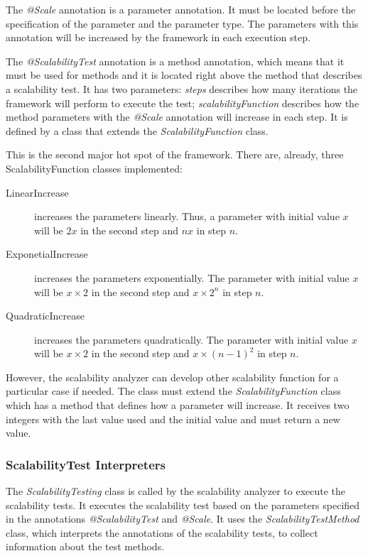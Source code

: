 The \emph{@Scale} annotation is a parameter annotation. It must be located before the specification of the parameter and the parameter type. The parameters with this annotation will be increased by the framework in each execution step.

The \emph{@ScalabilityTest} annotation is a method annotation, which means that it must be used for methods and it is located right above the method that describes a scalability test. It has two parameters: \emph{steps} describes how many iterations the framework will perform to execute the test; \emph{scalabilityFunction} describes how the method parameters with the \emph{@Scale} annotation will increase in each step. It is defined by a class that extends the \emph{ScalabilityFunction} class.

This is the second major hot spot of the framework. There are, already, three ScalabilityFunction classes implemented:
\begin{description}
\item[LinearIncrease] increases the parameters linearly. Thus, a parameter with initial value $x$ will be $2x$ in the second step and $nx$ in step $n$.
\item[ExponetialIncrease] increases the parameters exponentially. The parameter with initial value $x$ will be $x \times 2$ in the second step and $x \times 2^n$ in step $n$.
\item[QuadraticIncrease] increases the parameters quadratically. The parameter with initial value $x$ will be $x \times 2$ in the second step and $x \times (n-1)^2$ in step $n$.
\end{description}

However, the scalability analyzer can develop other scalability function for a particular case if needed. The class must extend the \emph{ScalabilityFunction} class which has a method that defines how a parameter will increase. It receives two integers with the last value used and the initial value and must return a new value.

\subsubsection{ScalabilityTest Interpreters}
The \emph{ScalabilityTesting} class is called by the scalability analyzer to execute the scalability tests. It executes the scalability test based on the parameters specified in the annotations \emph{@ScalabilityTest} and \emph{@Scale}. It uses the \emph{ScalabilityTestMethod} class, which interprets the annotations of the scalability tests, to collect information about the test methods.

